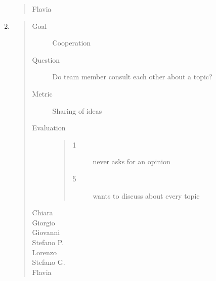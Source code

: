\documentclass[letterpaper,10pt,italian]{sphinxmanual}
\begin{document}
\begin{enumerate}
\begin{quote}
\begin{description}
\item[{Flavia}] \leavevmode
{}

\end{description}\end{quote}

\item {} \begin{quote}\begin{description}
\item[{Goal}] \leavevmode
\sphinxAtStartPar
Cooperation

\item[{Question}] \leavevmode
\sphinxAtStartPar
Do team member consult each other about a topic?

\item[{Metric}] \leavevmode
\sphinxAtStartPar
Sharing of ideas

\item[{Evaluation}] \leavevmode\begin{quote}\begin{description}
\item[{1}] \leavevmode
\sphinxAtStartPar
never asks for an opinion

\item[{5}] \leavevmode
\sphinxAtStartPar
wants to discuss about every topic

\end{description}\end{quote}

\item[{Chiara}] \leavevmode
{}

\item[{Giorgio}] \leavevmode
{}

\item[{Giovanni}] \leavevmode
{}

\item[{Stefano P.}] \leavevmode
{}

\item[{Lorenzo}] \leavevmode
{}

\item[{Stefano G.}] \leavevmode
{}

\item[{Flavia}] \leavevmode
{}

\end{description}\end{quote}


\end{enumerate}
\end{document}
